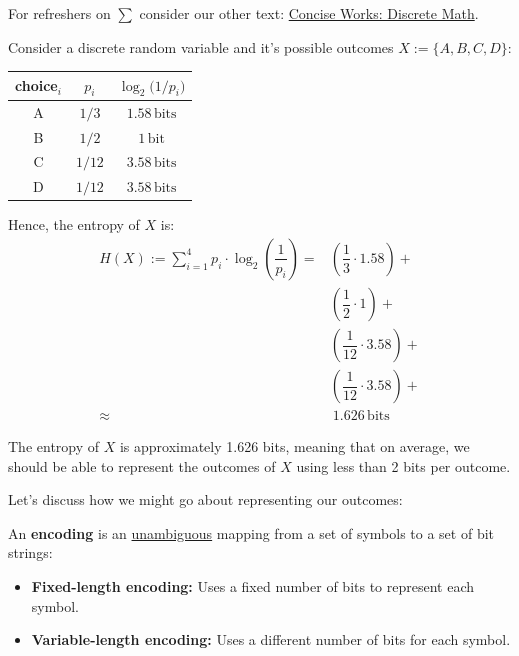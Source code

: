 \begin{Tip} For refreshers on $\sum$ consider our other text:
    \href{https://github.com/Concise-Works/Discrete-Math}{Concise Works: Discrete Math}.
\end{Tip}

\newpage 
\begin{Example}

    \label{ex:entropy_four}

    Consider a discrete random variable and it's possible outcomes $X:=\{A,B,C,D\}$:

    \begin{center}
        
        \begin{tabular}{c c c}
          \toprule
          choice$_i$ & $p_i$ & $\log_2\bigl(1/p_i\bigr)$ \\
          \midrule
          A & $\displaystyle 1/3$  & $1.58\,\mathrm{bits}$ \\
          B & $\displaystyle 1/2$  & $1\,\mathrm{bit}$    \\
          C & $\displaystyle 1/12$ & $3.58\,\mathrm{bits}$ \\
          D & $\displaystyle 1/12$ & $3.58\,\mathrm{bits}$ \\
          \bottomrule
        \end{tabular}
    \end{center}

    \noindent
    Hence, the entropy of $X$ is:
    \begin{align*}
        H(X) := \sum_{i=1}^{4} p_i \cdot \log_2\left(\dfrac{1}{p_i}\right)= & \left(\dfrac{1}{3} \cdot 1.58\right) +\\
        &\left(\dfrac{1}{2} \cdot 1\right) +\\
        &\left(\dfrac{1}{12} \cdot 3.58\right) +\\
        &\left(\dfrac{1}{12} \cdot 3.58\right) +\\
        \approx &\ 1.626\,\mathrm{bits}
    \end{align*}

    \noindent 
    The entropy of $X$ is approximately 1.626 bits, meaning that on average, we should be able to represent the outcomes of $X$ 
    using less than 2 bits per outcome.

\end{Example}

\noindent
Let's discuss how we might go about representing our outcomes:
\begin{Def}[Encoding]

    \label{def:encoding}
    
        An \textbf{encoding} is an \underline{unambiguous} mapping from a set of symbols to a set of bit strings:
        \begin{itemize}
                \item \textbf{Fixed-length encoding:} Uses a fixed number of bits to represent each symbol.
                \item \textbf{Variable-length encoding:} Uses a different number of bits for each symbol.
        \end{itemize}
\end{Def}

